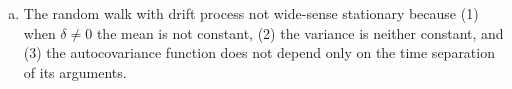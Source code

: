 \documentclass[12pt]{article}
\begin{document}
\begin{enumerate}
\begin{enumerate}[(a)]
            \item The random walk with drift process not wide-sense stationary
                because (1) when $\delta\neq 0$ the mean is not constant, (2)
                the variance is neither constant, and (3) the autocovariance
                function does not depend only on the time separation of its
                arguments.

        \end{enumerate}

\end{enumerate}
\end{document}
